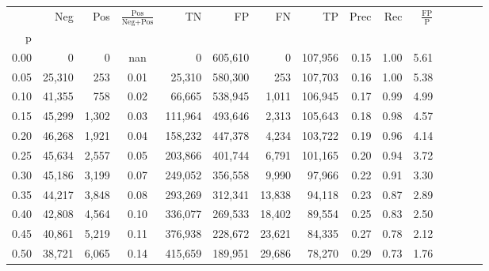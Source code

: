 \begin{tabular}{rrrcrrrrrrrrrrr}
\toprule
{} &     Neg &    Pos & $\frac{\text{Pos}}{\text{Neg}+\text{Pos}}$ &       TN &       FP &       FN &       TP &  Prec &   Rec & $\frac{\text{FP}}{\text{P}}$ \\
p    &         &        &                                            &          &          &          &          &       &       &                              \\
\midrule
0.00 &       0 &      0 &                                        nan &        0 &  605,610 &        0 &  107,956 &  0.15 &  1.00 &                         5.61 \\
0.05 &  25,310 &    253 &                                       0.01 &   25,310 &  580,300 &      253 &  107,703 &  0.16 &  1.00 &                         5.38 \\
0.10 &  41,355 &    758 &                                       0.02 &   66,665 &  538,945 &    1,011 &  106,945 &  0.17 &  0.99 &                         4.99 \\
0.15 &  45,299 &  1,302 &                                       0.03 &  111,964 &  493,646 &    2,313 &  105,643 &  0.18 &  0.98 &                         4.57 \\
0.20 &  46,268 &  1,921 &                                       0.04 &  158,232 &  447,378 &    4,234 &  103,722 &  0.19 &  0.96 &                         4.14 \\
0.25 &  45,634 &  2,557 &                                       0.05 &  203,866 &  401,744 &    6,791 &  101,165 &  0.20 &  0.94 &                         3.72 \\
0.30 &  45,186 &  3,199 &                                       0.07 &  249,052 &  356,558 &    9,990 &   97,966 &  0.22 &  0.91 &                         3.30 \\
0.35 &  44,217 &  3,848 &                                       0.08 &  293,269 &  312,341 &   13,838 &   94,118 &  0.23 &  0.87 &                         2.89 \\
0.40 &  42,808 &  4,564 &                                       0.10 &  336,077 &  269,533 &   18,402 &   89,554 &  0.25 &  0.83 &                         2.50 \\
0.45 &  40,861 &  5,219 &                                       0.11 &  376,938 &  228,672 &   23,621 &   84,335 &  0.27 &  0.78 &                         2.12 \\
0.50 &  38,721 &  6,065 &                                       0.14 &  415,659 &  189,951 &   29,686 &   78,270 &  0.29 &  0.73 &                         1.76 \\

\end{tabular}
